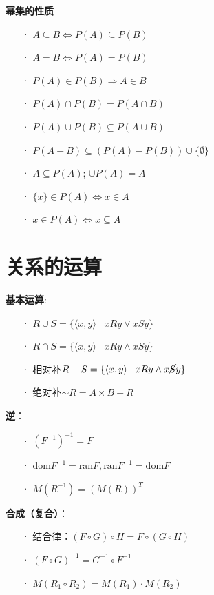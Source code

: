 	\textbf{幂集的性质}
	\begin{itemize}
		\item[·] $A \subseteq B \Leftrightarrow P(A) \subseteq P(B)$
		\item[·] $A = B \Leftrightarrow P(A) = P(B)$
		\item[·] $P(A) \in P(B) \Rightarrow A \in B$
		\item[·] $P(A) \cap P(B) = P(A \cap B)$
		\item[·] $P(A) \cup P(B) \subseteq P(A \cup B)$
		\item[·] $P(A - B) \subseteq (P(A) - P(B)) \cup \{\emptyset\}$
		\item[·] $A \subseteq P(A)$; $\cup P(A) = A$
		\item[·] $\{x\} \in P(A) \Leftrightarrow x \in A$
		\item[·] $x \in P(A) \Leftrightarrow x \subseteq A$
	\end{itemize}
	
	\section*{关系的运算}
	\textbf{基本运算}:
	\begin{itemize}
		\item[·] $R \cup S = \{ \langle x, y \rangle \mid x R y \lor x S y \}$
		\item[·] $R \cap S = \{ \langle x, y \rangle \mid x R y \land x S y \}$
		\item[·] 相对补$R - S = \{ \langle x, y \rangle \mid x R y \land x \cancel{S} y \}$
		\item[·] 绝对补$\sim R = A \times B - R$
	\end{itemize}

	\textbf{逆}：
	\begin{itemize}
		\item[·] $(F^{-1})^{-1} = F$
		\item[·] $\text{dom} F^{-1} = \text{ran} F, \text{ran} F^{-1} = \text{dom} F$
		\item[·] $M(R^{-1}) = (M(R))^T$
	\end{itemize}
	
	\textbf{合成（复合）}：
	\begin{itemize}
		\item[·] 结合律：$(F \circ G) \circ H = F \circ (G \circ H)$
		\item[·] $(F \circ G)^{-1} = G^{-1} \circ F^{-1}$
		\item[·] $M(R_1 \circ R_2) = M(R_1) \cdot M(R_2)$
	\end{itemize}
	
